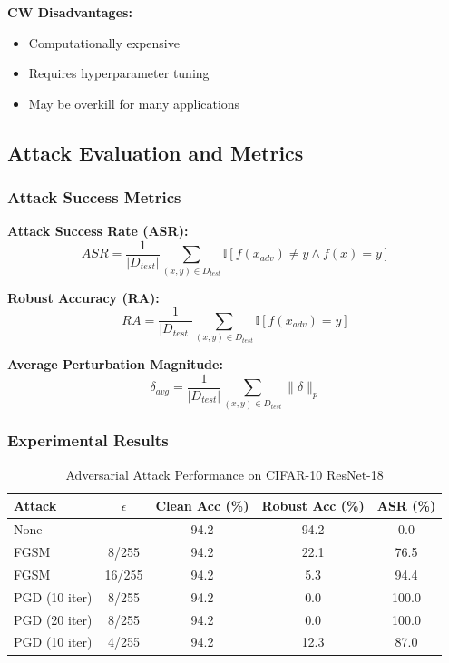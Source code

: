 \documentclass[conference]{IEEEtran}
\begin{document}
\textbf{CW Disadvantages:}
\begin{itemize}
  \item Computationally expensive
  \item Requires hyperparameter tuning
  \item May be overkill for many applications
\end{itemize}

\subsection{Attack Evaluation and Metrics}
\label{sec:q4_evaluation}

\subsubsection{Attack Success Metrics}
\label{sec:q4_attack_metrics}

\textbf{Attack Success Rate (ASR):}
\begin{equation}
ASR = \frac{1}{|D_{test}|} \sum_{(x,y) \in D_{test}} \mathbb{I}[f(x_{adv}) \neq y \land f(x) = y]
\end{equation}

\textbf{Robust Accuracy (RA):}
\begin{equation}
RA = \frac{1}{|D_{test}|} \sum_{(x,y) \in D_{test}} \mathbb{I}[f(x_{adv}) = y]
\end{equation}

\textbf{Average Perturbation Magnitude:}
\begin{equation}
\delta_{avg} = \frac{1}{|D_{test}|} \sum_{(x,y) \in D_{test}} \|\delta\|_p
\end{equation}

\subsubsection{Experimental Results}
\label{sec:q4_attack_results}

\begin{table}[H]
\centering
\caption{Adversarial Attack Performance on CIFAR-10 ResNet-18}
\begin{tabular}{l c c c c}
\toprule
Attack & $\epsilon$ & Clean Acc (\%) & Robust Acc (\%) & ASR (\%) \\
\midrule
None & - & 94.2 & 94.2 & 0.0 \\
FGSM & 8/255 & 94.2 & 22.1 & 76.5 \\
FGSM & 16/255 & 94.2 & 5.3 & 94.4 \\
PGD (10 iter) & 8/255 & 94.2 & 0.0 & 100.0 \\
PGD (20 iter) & 8/255 & 94.2 & 0.0 & 100.0 \\
PGD (10 iter) & 4/255 & 94.2 & 12.3 & 87.0 \\
\midrule
\end{tabular}
\label{tab:attack_performance}
\end{table}
\end{document}
